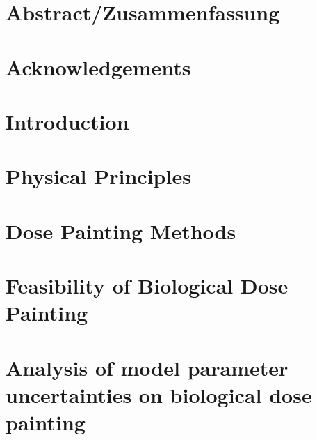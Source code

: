 



\cleardoublepage


\cleardoublepage

\chapter*{Abstract/Zusammenfassung}{}
\thispagestyle{empty}
\cleardoublepage

\chapter*{Acknowledgements}{}
\thispagestyle{empty}
\cleardoublepage

\newpage
\setcounter{page}{1}
\pagestyle{headings}

\renewcommand{\contentsname}{Table of Contents}
\tableofcontents
\cleardoublepage

\newpage
\setcounter{page}{1}

\chapter{Introduction}\label{chapter:1}


\chapter{Physical Principles}\label{chapter:2}


\chapter{Dose Painting Methods}\label{chapter:3}


\chapter{Feasibility of Biological Dose Painting}\label{chapter:4}


\chapter[Analysis of model parameter uncertainties]{Analysis of model parameter uncertainties on biological dose painting}\label{chapter:5}



